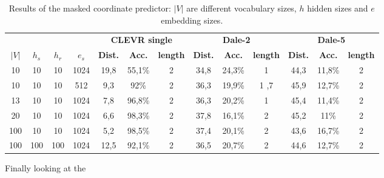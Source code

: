 \begin{table}[h]
    \centering
    \begin{tabular}{cccc|ccc|ccc|ccc}
        \toprule
              &         &          &         & \multicolumn{3}{c}{\textbf{CLEVR single}} & \multicolumn{3}{c}{\textbf{Dale-2}} & \multicolumn{3}{c}{\textbf{Dale-5}}                                                                                                       \\\cmidrule(lr){5-7}\cmidrule(lr){8-10}\cmidrule(lr){11-13}
        $|V|$ & $h_{s}$ & $h_{r}$  & $e_{s}$ & \textbf{Dist.}                            & \textbf{Acc.}                       & \textbf{length}                     & \textbf{Dist.} & \textbf{Acc.} & \textbf{length} & \textbf{Dist.} & \textbf{Acc.} & \textbf{length} \\\midrule
        {10}  & {10}    & {10}     & {1024}  & {19,8}                                    & {55,1\%}                            & {2}                                 & {34,8}         & {24,3\%}      & {1}             & {44,3}         & {11,8\%}      & {2}             \\
        {10}  & {10}    & {10}     & {512}   & {9,3}                                     & {92\%}                              & {2}                                 & {36,3}         & {19,9\%}      & {1
        ,7}   & {45,9}  & {12,7\%} & {2}                                                                                                                                                                                                                                   \\
        {13}  & {10}    & {10}     & {1024}  & {7,8}                                     & {96,8\%}                            & {2}                                 & {36,3}         & {20,2\%}      & {1}             & {45,4}         & {11,4\%}      & {2}             \\
        {20}  & {10}    & {10}     & {1024}  & {6,6}                                     & {98,3\%}                            & {2}                                 & {37,8}         & {16,1\%}      & {2}             & {45,2}         & {11\%}        & {2}             \\
        {100} & {10}    & {10}     & {1024}  & {5,2}                                     & {98,5\%}                            & {2}                                 & {37,4}         & {20,1\%}      & {2}             & {43,6}         & {16,7\%}      & {2}             \\
        {100} & {100}   & {100}    & {1024}  & {12,5}                                    & {92,1\%}                            & {2}                                 & {36,5}         & {20,7\%}      & {2}             & {44,6}         & {12,7\%}      & {2}             \\
        \bottomrule
    \end{tabular}
    \caption{Results of the masked coordinate predictor: $|V|$ are different vocabulary sizes, $h$ hidden sizes and $e$ embedding sizes.}
    \label{tab:results_masked_predictor_game}
\end{table}

Finally looking at the
